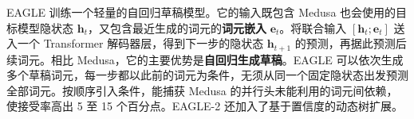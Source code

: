 \begin{interview}
EAGLE 训练一个轻量的自回归草稿模型。它的输入既包含 Medusa 也会使用的目标模型隐状态 \(\mathbf{h}_t\)，又包含最近生成的词元的\textbf{词元嵌入} \(\mathbf{e}_t\)。将联合输入 \([\mathbf{h}_t;\mathbf{e}_t]\) 送入一个 Transformer 解码器层，得到下一步的隐状态 \(\mathbf{h}_{t+1}\) 的预测，再据此预测后续词元。相比 Medusa，它的主要优势是\textbf{自回归生成草稿}。EAGLE 可以依次生成多个草稿词元，每一步都以此前的词元为条件，无须从同一个固定隐状态出发预测全部词元。按顺序引入条件，能捕获 Medusa 的并行头未能利用的词元间依赖，使接受率高出 5 至 15 个百分点。EAGLE-2 还加入了基于置信度的动态树扩展。
\end{interview}
